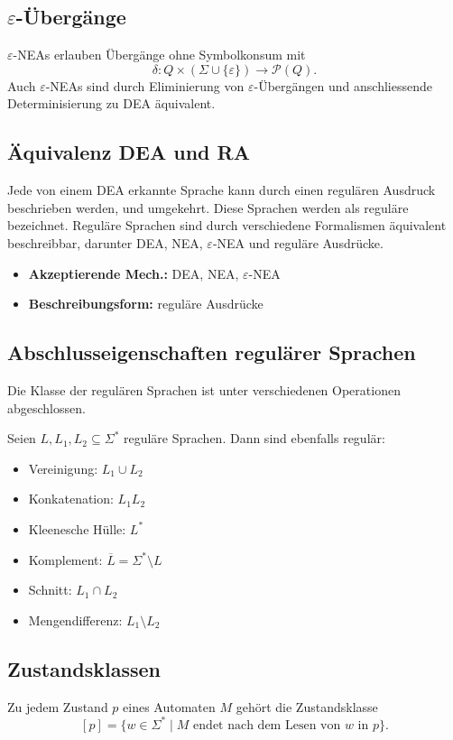 \subsection{$\varepsilon$-Übergänge}
\(\varepsilon\)-NEAs erlauben Übergänge ohne Symbolkonsum mit
\[
    \delta : Q \times (\Sigma \cup \{\varepsilon\}) \to \mathcal{P}(Q).
\]
Auch \(\varepsilon\)-NEAs sind durch Eliminierung von \(\varepsilon\)-Übergängen und anschliessende Determinisierung zu DEA äquivalent.


\subsection{Äquivalenz DEA und RA}
Jede von einem DEA erkannte Sprache kann durch einen regulären Ausdruck beschrieben werden, und umgekehrt. Diese Sprachen werden als reguläre bezeichnet.
Reguläre Sprachen sind durch verschiedene Formalismen äquivalent beschreibbar, darunter DEA, NEA, \(\varepsilon\)-NEA und reguläre Ausdrücke.
\begin{itemize}
    \item \textbf{Akzeptierende Mech.:} DEA, NEA, \(\varepsilon\)-NEA
    \item \textbf{Beschreibungsform:} reguläre Ausdrücke
\end{itemize}

\subsection*{Abschlusseigenschaften regulärer Sprachen}
Die Klasse der regulären Sprachen ist unter verschiedenen Operationen abgeschlossen.

Seien $L, L_1, L_2 \subseteq \Sigma^*$ reguläre Sprachen. Dann sind ebenfalls regulär:
\begin{itemize}
    \item Vereinigung: \(L_1 \cup L_2\)
    \item Konkatenation: \(L_1 L_2\)
    \item Kleenesche Hülle: \(L^*\)
    \item Komplement: \(\overline{L} = \Sigma^* \setminus L\)
    \item Schnitt: \(L_1 \cap L_2\)
    \item Mengendifferenz: \(L_1 \setminus L_2\)
\end{itemize}

\subsection*{Zustandsklassen}
Zu jedem Zustand $p$ eines Automaten $M$ gehört die Zustandsklasse
\[
[p] = \{ w \in \Sigma^* \mid M \text{ endet nach dem Lesen von } w \text{ in } p \}.
\]

